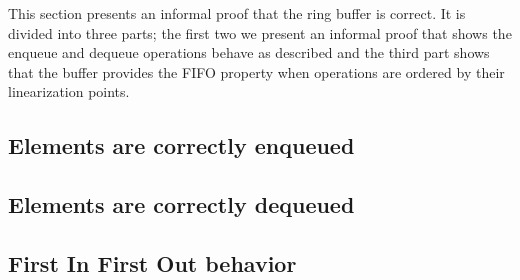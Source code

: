 

\newtheorem{lemma}{Lemma}
\newtheorem{theorem}{Theorem}

This section presents an informal proof that the ring buffer is correct.
It is divided into three parts; the first two we present an informal proof that shows the enqueue and dequeue operations behave as described and the third part shows that the buffer provides the FIFO property when operations are ordered by their linearization points.

\subsection{Elements are correctly enqueued}

\subsection{Elements are correctly dequeued}

\subsection{First In First Out behavior }

